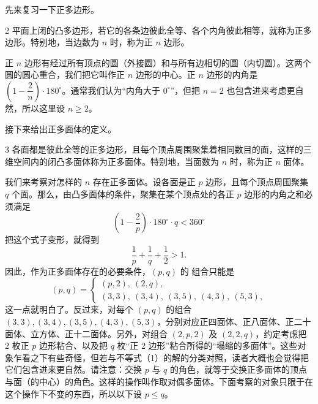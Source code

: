 先来复习一下正多边形。

\begin{definition}{2}
  平面上闭的凸多边形，若它的各条边彼此全等、各个内角彼此相等，就称为正多边形。特别地，当边数为 $n$ 时，称为正 $n$ 边形。
\end{definition}

正 $n$ 边形有经过所有顶点的圆（外接圆）和与所有边相切的圆（内切圆）。这两个圆的圆心重合，我们把它叫作正 $n$ 边形的中心。正 $n$ 边形的内角是 $\left(1-\dfrac{2}{n}\right)\cdot 180^\circ$。通常我们认为“内角大于 $0^\circ$”，但把 $n=2$ 也包含进来考虑更自然，所以这里设 $n\ge 2$。

接下来给出正多面体的定义。

\begin{definition}{3}
  各面都是彼此全等的正多边形，且每个顶点周围聚集着相同数目的面，这样的三维空间内的闭凸多面体称为正多面体。特别地，当面数为 $n$ 时，称为正 $n$ 面体。
\end{definition}

我们来考察对怎样的 $n$ 存在正多面体。设各面是正 $p$ 边形，且每个顶点周围聚集 $q$ 个面。那么，由凸多面体的条件，聚集在某个顶点处的各正 $p$ 边形的内角之和必须满足
\begin{equation}
  \left(1-\frac{2}{p}\right)\cdot 180^\circ\cdot q<360^\circ \tag{3}
\end{equation}
把这个式子变形，就得到
\[
  \frac{1}{p}+\frac{1}{q}+\frac{1}{2}>1.
\]
因此，作为正多面体存在的必要条件，$(p,q)$ 的
组合只能是
\begin{equation}
  (p,q)=
  \begin{cases}
    (p,2),\ (2,q),\\
    (3,3),\ (3,4),\ (3,5),\ (4,3),\ (5,3),
  \end{cases}
  \tag{4}
\end{equation}
这一点就明白了。反过来，对每个 $(p,q)$ 的组合 $(3,3),(3,4),(3,5),(4,3),(5,3)$，分别对应正四面体、正八面体、正二十面体、立方体、正十二面体。另外，对组合 $(2,p,2)$ 及 $(2,2,q)$，约定考虑把 2 枚正 $p$ 边形粘合、以及把 $q$ 枚“正 2 边形”粘合所得的“塌缩的多面体”。这些对象乍看之下有些奇怪，但若与不等式（1）的解的分类对照，读者大概也会觉得把它们包含进来更自然。请注意：交换 $p$ 与 $q$ 的角色，就等于交换正多面体的顶点与面（的中心）的角色。这样的操作叫作取对偶多面体。下面考察的对象只限于在这个操作下不变的东西，所以以下设 $p\le q$。

